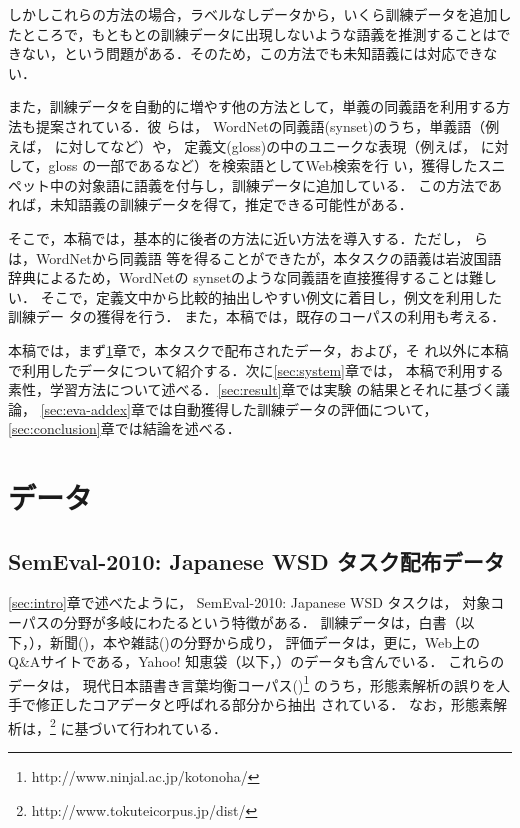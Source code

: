 \documentclass[japanese]{jnlp_1.4}
\newcommand{\OW}{}
\newcommand{\OC}{}
\newcommand{\PN}{}
\newcommand{\PB}{}
\newcommand{\unidic}{}
\newcommand{\bccwj}{}
\begin{document}
しかしこれらの方法の場合，ラベルなしデータから，いくら訓練データを追加し
たところで，もともとの訓練データに出現しないような語義を推測することはで
きない，という問題がある．そのため，この方法でも未知語義には対応できない．

また，訓練データを自動的に増やす他の方法として，単義の同義語を利用する方
法も提案されている\cite{Mihalcea:Moldovan:1999,Agirre:Martinez:2000}．彼
らは，
WordNetの同義語(synset)のうち，単義語（例えば，
に対してなど）や，
定義文(gloss)の中のユニークな表現（例えば，
に対して，gloss の一部であるなど）を検索語としてWeb検索を行
い，獲得したスニペット中の対象語に語義を付与し，訓練データに追加している．
この方法であれば，未知語義の訓練データを得て，推定できる可能性がある．


そこで，本稿では，基本的に後者の方法に近い方法を導入する．ただし，
\cite{Mihalcea:Moldovan:1999,Agirre:Martinez:2000}らは，WordNetから同義語
等を得ることができたが，本タスクの語義は岩波国語辞典によるため，WordNetの
synsetのような同義語を直接獲得することは難しい．
そこで，定義文中から比較的抽出しやすい例文に着目し，例文を利用した訓練デー
タの獲得を行う．
また，本稿では，既存のコーパスの利用も考える．

本稿では，まず\ref{sec:data}章で，本タスクで配布されたデータ，および，そ
れ以外に本稿で利用したデータについて紹介する．次に\ref{sec:system}章では，
本稿で利用する素性，学習方法について述べる．\ref{sec:result}章では実験
の結果とそれに基づく議論，
\ref{sec:eva-addex}章では自動獲得した訓練データの評価について，
\ref{sec:conclusion}章では結論を述べる．


\section{データ} 
\label{sec:data} 

\subsection{SemEval-2010: Japanese WSD タスク配布データ} 
\label{sec:jwsd}


\ref{sec:intro}章で述べたように，
SemEval-2010: Japanese WSD タスクは，
対象コーパスの分野が多岐にわたるという特徴がある．
訓練データは，白書（以下，\OW{}），新聞(\PN)，本や雑誌(\PB)の分野から成り，
評価データは，更に，Web上のQ\&Aサイトである，Yahoo! 知恵袋（以下，\OC{}）のデータも含んでいる．
これらのデータは，
現代日本語書き言葉均衡コーパス(\bccwj)\footnote{http://www.ninjal.ac.jp/kotonoha/}
のうち，形態素解析の誤りを人手で修正したコアデータと呼ばれる部分から抽出
されている．
なお，形態素解析は，\unidic\footnote{http://www.tokuteicorpus.jp/dist/} に基づいて行われている．
\end{document}
